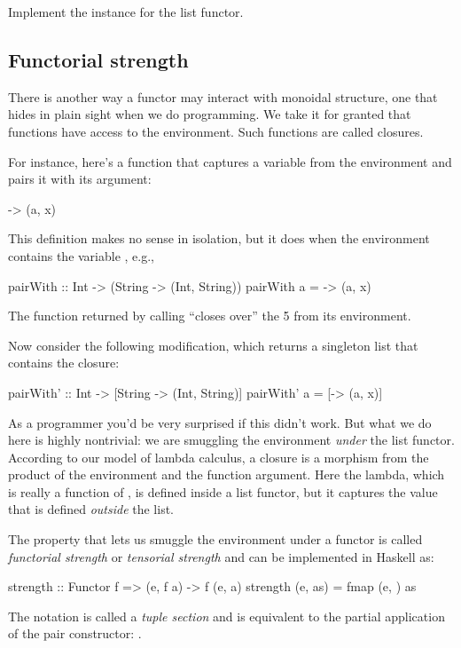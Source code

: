 \documentclass[DaoFP]{subfiles}
\begin{document}
\begin{exercise}
Implement the  instance for the list functor.
\end{exercise}

\subsection{Functorial strength}

There is another way a functor may interact with monoidal structure, one that hides in plain sight when we do programming. We take it for granted that functions have access to the environment. Such functions are called closures. 

For instance, here's a function that captures a variable  from the environment and pairs it with its argument:
\begin{haskell}
\x -> (a, x)
\end{haskell}
This definition makes no sense in isolation, but it does when the environment contains the variable , e.g.,
\begin{haskell}
pairWith :: Int -> (String -> (Int, String))
pairWith a = \x -> (a, x)
\end{haskell}
The function returned by calling  ``closes over'' the 5 from its environment.

Now consider the following modification, which returns a singleton list that contains the closure:
\begin{haskell}
pairWith' :: Int -> [String -> (Int, String)]
pairWith' a = [\x -> (a, x)]
\end{haskell}
As a programmer you'd be very surprised if this didn't work. But what we do here is highly nontrivial: we are smuggling the environment \emph{under} the list functor. According to our model of lambda calculus, a closure is a morphism from the product of the environment and the function argument. Here the lambda, which is really a function of , is defined inside a list functor, but it captures the value  that is defined \emph{outside} the list.

The property that lets us smuggle the environment under a functor is called \emph{functorial strength} or \emph{tensorial strength} and can be implemented in Haskell as:
\begin{haskell}
strength :: Functor f => (e, f a) -> f (e, a)
strength (e, as) = fmap (e, ) as
\end{haskell}
The notation  is called a \emph{tuple section} and is equivalent to the partial application of the pair constructor: .
\end{document}

